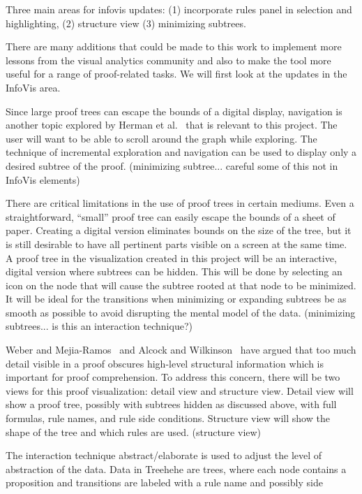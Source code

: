 \documentclass[conference]{IEEEtran}
\newcommand{\projectname}{Treehehe}
\begin{document}
Three main areas for infovis updates: (1) incorporate rules panel in selection and highlighting, (2) structure view (3) minimizing subtrees.

There are many additions that could be made to this work to implement more lessons from the visual analytics community and also to make the tool more useful for a range of proof-related tasks. We will first look at the updates in the InfoVis area.

Since large proof trees can escape the bounds of a digital display, navigation is another topic explored by Herman et al.~\cite{graphvis-herman+melancon+marshall} that is relevant to this project. The user will want to be able to scroll around the graph while exploring. The technique of incremental exploration and navigation can be used to display only a desired subtree of the proof. (minimizing subtree... careful some of this not in InfoVis elements)

There are critical limitations in the use of proof trees in certain mediums. Even a straightforward, ``small'' proof tree can easily escape the bounds of a sheet of paper. Creating a digital version eliminates bounds on the size of the tree, but it is still desirable to have all pertinent parts visible on a screen at the same time. A proof tree in the visualization created in this project will be an interactive, digital version where subtrees can be hidden. This will be done by selecting an icon on the node that will cause the subtree rooted at that node to be minimized. It will be ideal for the transitions when minimizing or expanding subtrees be as smooth as possible to avoid disrupting the mental model of the data. (minimizing subtrees... is this an interaction technique?)



Weber and Mejia-Ramos~\cite{majorsbeliefs-weber+mejiaramos} and Alcock and Wilkinson~\cite{eproofs-alcock+wilkinson} have argued that too much detail visible in a proof obscures high-level structural information which is important for proof comprehension. To address this concern, there will be two views for this proof visualization: detail view and structure view. Detail view will show a proof tree, possibly with subtrees hidden as discussed above, with full formulas, rule names, and rule side conditions. Structure view will show the shape of the tree and which rules are used. (structure view)

The interaction technique abstract/elaborate is used to adjust the level of abstraction of the data. Data in \projectname{} are trees, where each node contains a proposition and transitions are labeled with a rule name and possibly side conditions. Two alternative views will be available for a proof tree. One will display the tree with all detail, and the other will only show the rules that are used, allowing a more abstract and structural perspective of the tree. (structure view)
\end{document}
